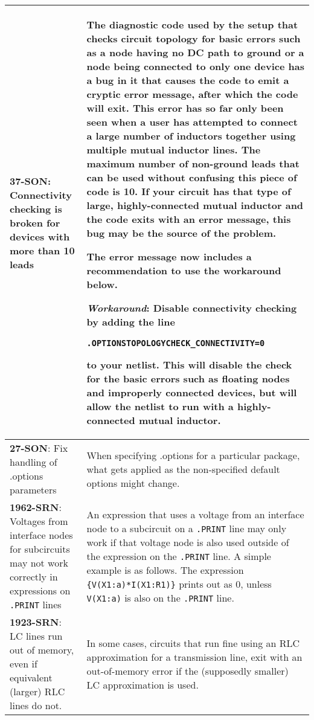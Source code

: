 {\begin{longtable}[h] {>{\raggedright\small}m{2in}|>{\raggedright\let\\\tabularnewline\small}m{3.5in}}
\textbf{37-SON}: Connectivity checking is broken for devices with more than 10
leads & The diagnostic code used by the \Xyce{} setup that checks circuit
topology for basic errors such as a node having no DC path to ground or a node
being connected to only one device has a bug in it that causes the code to emit
a cryptic error message, after which the code will exit.  This error has so far
only been seen when a user has attempted to connect a large number of inductors
together using multiple mutual inductor lines.  The maximum number of
non-ground leads that can be used without confusing this piece of code is 10.
If your circuit has that type of large, highly-connected mutual inductor and
the code exits with an error message, this bug may be the source of the problem.

The error message now includes a recommendation to use the workaround below.

\textbf{\textit{Workaround}}: Disable connectivity checking by adding the line

\begin{alltt} .OPTIONS TOPOLOGY CHECK_CONNECTIVITY=0 \end{alltt}

to your netlist.  This will disable the check for the basic errors such as
floating nodes and improperly connected devices, but will allow the netlist to
run with a highly-connected mutual inductor.
\\ \hline


\textbf{27-SON}: Fix handling of .options parameters & When specifying .options
  for a particular package, what gets applied as the non-specified default
  options might change.  \\ \hline

\textbf{1962-SRN}: Voltages from interface nodes for subcircuits may not work
correctly in expressions on \texttt{.PRINT} lines & An expression that uses a 
voltage from an interface node to a subcircuit on a \texttt{.PRINT} line 
may only work if that voltage node is also used outside of the expression on 
the \texttt{.PRINT} line.  A simple example is as follows.  The expression 
\texttt{\{V(X1:a)*I(X1:R1)\}} prints out as 0, unless \texttt{V(X1:a)} is also on 
the \texttt{.PRINT} line.
\\ \hline

\textbf{1923-SRN}: LC lines run out of memory, even if equivalent (larger) RLC
lines do not. &  In some cases, circuits that run fine using an RLC approximation for a
transmission line, exit with an out-of-memory error if the (supposedly smaller) LC
approximation is used.
\\ \hline


\end{longtable}}
